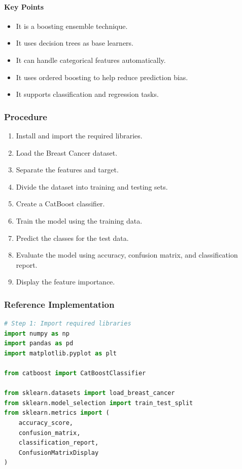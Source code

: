 \documentclass[a4paper,11pt]{article}
\begin{document}
\begin{itemize}
\paragraph{Key Points}
\begin{itemize}
    \item It is a boosting ensemble technique.
    \item It uses decision trees as base learners.
    \item It can handle categorical features automatically.
    \item It uses ordered boosting to help reduce prediction bias.
    \item It supports classification and regression tasks.
\end{itemize}

\subsubsection{Procedure}
\begin{enumerate}
    \item Install and import the required libraries.
    \item Load the Breast Cancer dataset.
    \item Separate the features and target.
    \item Divide the dataset into training and testing sets.
    \item Create a CatBoost classifier.
    \item Train the model using the training data.
    \item Predict the classes for the test data.
    \item Evaluate the model using accuracy, confusion matrix, and classification report.
    \item Display the feature importance.
\end{enumerate}

\subsubsection{Reference Implementation}
\begin{lstlisting}[language=Python, caption={CatBoost Implementation}]
# Step 1: Import required libraries
import numpy as np
import pandas as pd
import matplotlib.pyplot as plt

from catboost import CatBoostClassifier

from sklearn.datasets import load_breast_cancer
from sklearn.model_selection import train_test_split
from sklearn.metrics import (
    accuracy_score,
    confusion_matrix,
    classification_report,
    ConfusionMatrixDisplay
)


\end{lstlisting}
\end{itemize}
\end{document}
